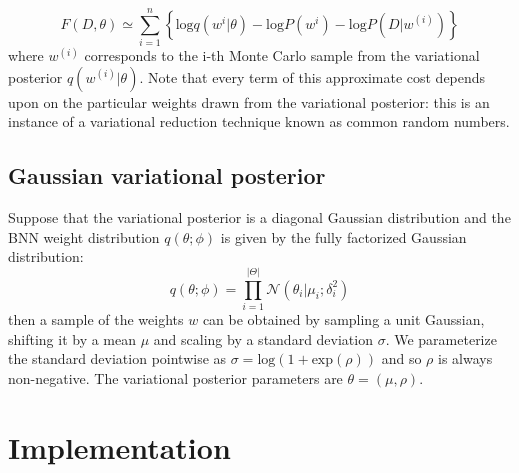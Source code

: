 \documentclass{article}
\begin{document}
	 
	 \begin{equation}
	 F(D,\theta) \simeq \sum_{i=1}^{n}\left\{\text{log}q(w^{i}|\theta) - \text{log}P(w^{i}) - \text{log}P(D|w^{(i)})\right\}
	 \end{equation}
	 where $w^{(i)}$ corresponds to the i-th Monte Carlo sample from the variational posterior $q(w^{(i)}|\theta)$. Note that every term of this approximate cost depends upon on the particular weights drawn from the variational posterior: this is an instance of a variational reduction technique known as common random numbers.
	 \subsection{Gaussian variational posterior}
	 Suppose that the variational posterior is a diagonal Gaussian distribution and the BNN weight distribution $q(\theta;\phi)$ is given by the fully factorized Gaussian distribution:
	 \begin{equation}
	 q(\theta;\phi) = \prod_{i=1}^{|\Theta|}\mathcal{N}(\theta_i|\mu_i;\delta_i^{2})
	 \end{equation}
	 then a sample of the weights $w$ can be obtained by sampling a unit Gaussian, shifting it by a mean $\mu$ and scaling by a standard deviation $\sigma$. We parameterize the standard deviation pointwise as $\sigma = \text{log}(1+\text{exp}(\rho))$ and so $\rho$ is always non-negative. The variational posterior parameters are $\theta = (\mu,\rho)$.
	 \section{Implementation}
\end{document}
